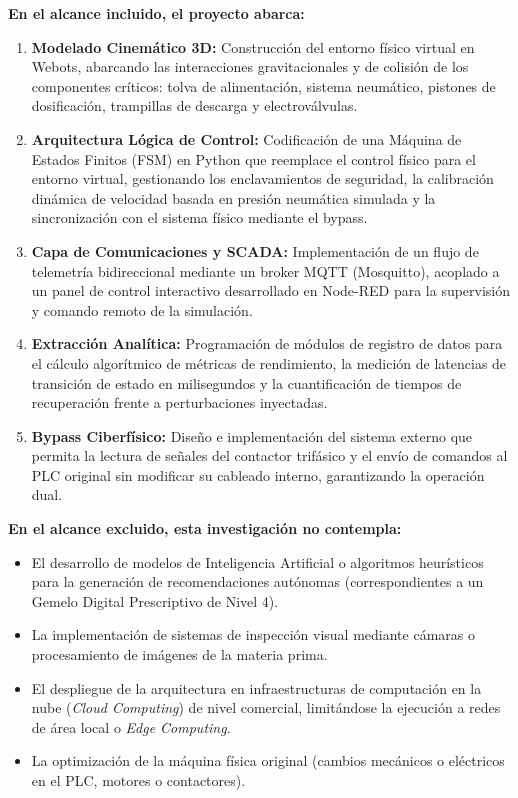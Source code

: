 \textbf{En el alcance incluido, el proyecto abarca:}
\begin{enumerate}
  \item \textbf{Modelado Cinemático 3D:} Construcción del entorno físico virtual en Webots, abarcando las interacciones gravitacionales y de colisión de los componentes críticos: tolva de alimentación, sistema neumático, pistones de dosificación, trampillas de descarga y electroválvulas.
  \item \textbf{Arquitectura Lógica de Control:} Codificación de una Máquina de Estados Finitos (FSM) en Python que reemplace el control físico para el entorno virtual, gestionando los enclavamientos de seguridad, la calibración dinámica de velocidad basada en presión neumática simulada y la sincronización con el sistema físico mediante el bypass.
  \item \textbf{Capa de Comunicaciones y SCADA:} Implementación de un flujo de telemetría bidireccional mediante un broker MQTT (Mosquitto), acoplado a un panel de control interactivo desarrollado en Node-RED para la supervisión y comando remoto de la simulación.
  \item \textbf{Extracción Analítica:} Programación de módulos de registro de datos para el cálculo algorítmico de métricas de rendimiento, la medición de latencias de transición de estado en milisegundos y la cuantificación de tiempos de recuperación frente a perturbaciones inyectadas.
  \item \textbf{Bypass Ciberfísico:} Diseño e implementación del sistema externo que permita la lectura de señales del contactor trifásico y el envío de comandos al PLC original sin modificar su cableado interno, garantizando la operación dual.
\end{enumerate}

\textbf{En el alcance excluido, esta investigación no contempla:}
\begin{itemize}
  \item El desarrollo de modelos de Inteligencia Artificial o algoritmos heurísticos para la generación de recomendaciones autónomas (correspondientes a un Gemelo Digital Prescriptivo de Nivel 4).
  \item La implementación de sistemas de inspección visual mediante cámaras o procesamiento de imágenes de la materia prima.
  \item El despliegue de la arquitectura en infraestructuras de computación en la nube (\textit{Cloud Computing}) de nivel comercial, limitándose la ejecución a redes de área local o \textit{Edge Computing}.
  \item La optimización de la máquina física original (cambios mecánicos o eléctricos en el PLC, motores o contactores).
\end{itemize}

